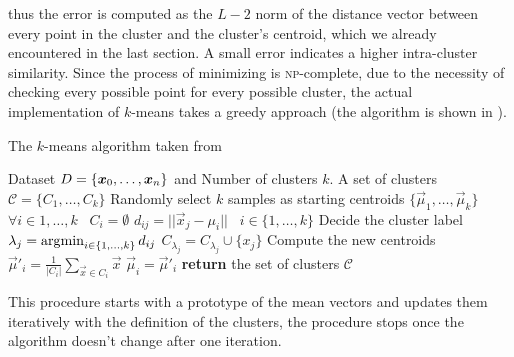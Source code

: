 thus the error is computed as the $L-2$ norm of the distance vector between every point in the
cluster and the cluster's centroid, which we already encountered in the last section. A small error
indicates a higher intra-cluster similarity. Since the process of minimizing
 is \textsc{np}-complete, due to the necessity of checking every possible
point for every possible cluster, the actual implementation of $k$-means takes a greedy approach
(the algorithm is shown in ).
\begin{algorithm}
	\caption{The $k$-means algorithm taken from \cite{ZhouZhi-Hua2021ML}}\label{algo:kmeans}
	\begin{algorithmic}[1]
		\Require Dataset $D = \{\boldsymbol{x}_0, \ldots, \boldsymbol{x}_n\}$ and Number of clusters $k$.
		\Ensure A set of clusters $\mathcal{C} = \{C_1, \ldots, C_k\}$
		\State Randomly select $k$ samples as starting centroids $\{\vec{\mu}_1, \ldots,
		\vec{\mu}_k\}$
		\State $\forall i \in {1, \ldots, k} \hspace{10pt} C_i = \emptyset$
		\State $d_{ij} = ||\vec{x}_j - \mu_i|| \hspace{10pt} i \in \{1, \ldots, k\}$ 
		\State Decide the cluster label $\lambda_j = \operatorname*{\arg\!\min}_{i \in \{1, \ldots, k\}}d_{ij}$
		\State $C_{\lambda_j} = C_{\lambda_j}\cup\{x_j\}$
		\EndFor
		\State Compute the new centroids $\vec{\mu}'_i = \frac{1}{|C_i|} \sum_{\vec{x} \in C_i}\vec{x}$
		\EndFor
		\State $\vec{\mu}_i = \vec{\mu}'_i$
		\EndIf
		\EndWhile
		\State \textbf{return} the set of clusters $\mathcal{C}$
		\EndFunction
	\end{algorithmic}
\end{algorithm}
This procedure starts with a prototype of the mean vectors and updates them iteratively with the
definition of the clusters, the procedure stops once the algorithm doesn't change after one
iteration.











